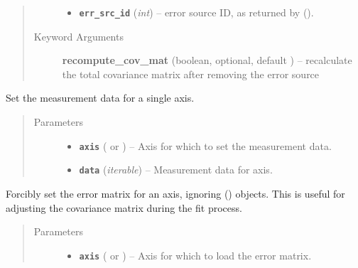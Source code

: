 \documentclass[a4paper,10pt,english]{sphinxmanual}
\begin{document}
\begin{fulllineitems}
\begin{fulllineitems}
\begin{quote}
\begin{description}
\begin{itemize}
\item {} 
\textbf{\texttt{err\_src\_id}} (\emph{int}) -- error source ID, as returned by
{\hyperref[index:kafe.dataset.Dataset.add_error_source]{\emph{}}} ().

\end{itemize}

\item[{Keyword Arguments}] \leavevmode
\textbf{recompute\_cov\_mat} (boolean, optional, default ) --
recalculate the total covariance matrix after removing the error
source

\end{description}\end{quote}

\end{fulllineitems}


\begin{fulllineitems}
\label{index:kafe.dataset.Dataset.set_axis_data}
Set the measurement data for a single axis.
\begin{quote}\begin{description}
\item[{Parameters}] \leavevmode\begin{itemize}
\item {} 
\textbf{\texttt{axis}} ( or ) -- Axis for which to set the measurement data.

\item {} 
\textbf{\texttt{data}} (\emph{iterable}) -- Measurement data for axis.

\end{itemize}

\end{description}\end{quote}

\end{fulllineitems}


\begin{fulllineitems}
\label{index:kafe.dataset.Dataset.set_cov_mat}
Forcibly set the error matrix for an axis, ignoring {\hyperref[index:kafe.dataset.ErrorSource]{\emph{}}} ()
objects. This is useful for adjusting the covariance matrix during the
fit process.
\begin{quote}\begin{description}
\item[{Parameters}] \leavevmode\begin{itemize}
\item {} 
\textbf{\texttt{axis}} ( or ) -- Axis for which to load the error matrix.


\end{itemize}
\end{description}
\end{quote}
\end{fulllineitems}
\end{fulllineitems}
\end{document}
